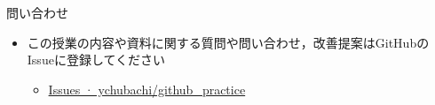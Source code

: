\documentclass[a4paper,twoside,twocolumn]{beamer}
\begin{document}
\begin{frame}[label=sec-6]{問い合わせ}
\begin{itemize}
\item この授業の内容や資料に関する質問や問い合わせ，改善提案はGitHubのIssueに登録してください
\begin{itemize}
\item \href{https://github.com/ychubachi/github_practice/issues}{Issues · ychubachi/github\_practice}
\end{itemize}
\end{itemize}
\end{frame}
\end{document}
